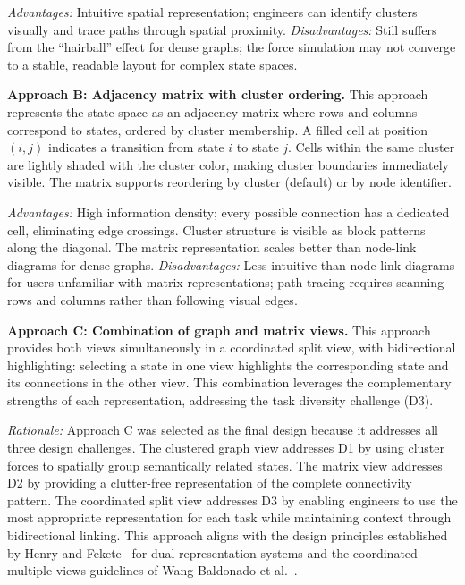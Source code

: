 \documentclass[conference]{IEEEtran}
\begin{document}
\textit{Advantages:} Intuitive spatial representation; engineers can identify clusters visually and trace paths through spatial proximity. \textit{Disadvantages:} Still suffers from the ``hairball'' effect for dense graphs; the force simulation may not converge to a stable, readable layout for complex state spaces.

\textbf{Approach B: Adjacency matrix with cluster ordering.} This approach represents the state space as an adjacency matrix where rows and columns correspond to states, ordered by cluster membership. A filled cell at position $(i, j)$ indicates a transition from state $i$ to state $j$. Cells within the same cluster are lightly shaded with the cluster color, making cluster boundaries immediately visible. The matrix supports reordering by cluster (default) or by node identifier.

\textit{Advantages:} High information density; every possible connection has a dedicated cell, eliminating edge crossings. Cluster structure is visible as block patterns along the diagonal. The matrix representation scales better than node-link diagrams for dense graphs. \textit{Disadvantages:} Less intuitive than node-link diagrams for users unfamiliar with matrix representations; path tracing requires scanning rows and columns rather than following visual edges.

\textbf{Approach C: Combination of graph and matrix views.} This approach provides both views simultaneously in a coordinated split view, with bidirectional highlighting: selecting a state in one view highlights the corresponding state and its connections in the other view. This combination leverages the complementary strengths of each representation, addressing the task diversity challenge (D3).

\textit{Rationale:} Approach C was selected as the final design because it addresses all three design challenges. The clustered graph view addresses D1 by using cluster forces to spatially group semantically related states. The matrix view addresses D2 by providing a clutter-free representation of the complete connectivity pattern. The coordinated split view addresses D3 by enabling engineers to use the most appropriate representation for each task while maintaining context through bidirectional linking. This approach aligns with the design principles established by Henry and Fekete~\cite{henry2006matrixexplorer} for dual-representation systems and the coordinated multiple views guidelines of Wang Baldonado et al.~\cite{baldonado2000guidelines}.
\end{document}
